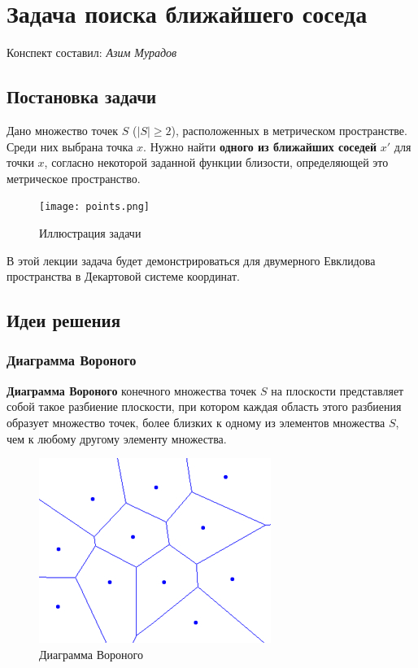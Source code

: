 \section{Задача поиска ближайшего соседа}
\begin{center}
    Конспект составил: \textit{Азим Мурадов}
\end{center}

\subsection{Постановка задачи}

Дано множество точек $S$ ($|S| \geq 2$), расположенных в метрическом пространстве. Среди них выбрана точка $x$.
Нужно найти \textbf{одного из ближайших соседей} $x'$ для точки $x$, согласно некоторой заданной функции близости, определяющей это метрическое пространство.

\begin{figure}[H]
    \centering
    \texttt{[image: points.png]}
    \caption{Иллюстрация задачи}
\end{figure}

В этой лекции задача будет демонстрироваться для двумерного Евклидова пространства в Декартовой системе координат.

\subsection{Идеи решения}

\subsubsection*{Диаграмма Вороного}

\textbf{Диаграмма Вороного} конечного множества точек $S$ на плоскости представляет собой такое разбиение плоскости, при котором каждая область этого разбиения образует множество точек, более близких к одному из элементов множества $S$, чем к любому другому элементу множества.

\begin{figure}[H]
    \centering
    \includegraphics[width=0.75\linewidth]{voronoi-diagram.jpg}
    \caption{Диаграмма Вороного}
\end{figure}

